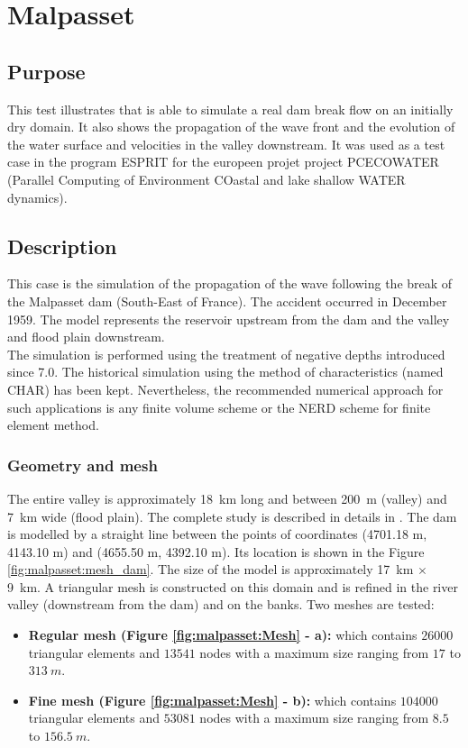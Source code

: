 \chapter{Malpasset}
\section{Purpose}
%
This test illustrates that  is able to simulate a real dam break flow
on an initially dry domain. It also shows the propagation of the wave front
and the evolution of the water surface and velocities in the valley downstream.
It was used as a test case in the program ESPRIT for the europeen projet project
PCECOWATER (Parallel Computing of Environment COastal and lake shallow WATER dynamics).
%
\section{Description}
%
This case is the simulation of the propagation of the wave following the break of the Malpasset dam (South-East of France). The accident occurred in December 1959. The model represents the reservoir upstream from the dam and the valley and flood plain downstream. \\

The simulation is performed using the treatment of negative depths introduced since  7.0. The historical simulation using the method of characteristics (named CHAR) has been kept. Nevertheless, the recommended numerical approach for such applications is any finite volume scheme or the NERD scheme for finite element method.

\subsection{Geometry and mesh}
The entire valley is approximately 18~km long and between 200~m (valley) and 7~km wide (flood plain). The complete study is described in details in \cite{Hervouet2007}.
The dam is modelled by a straight line between the points of coordinates (4701.18 m, 4143.10 m) and (4655.50 m, 4392.10 m). Its location is shown in the Figure \ref{fig:malpasset:mesh_dam}.
The size of the model is approximately  17~km $\times$ 9~km. A triangular mesh is constructed on this domain and is refined in the river valley (downstream from the dam) and on the banks.
Two meshes are tested:
\begin{itemize}
\item \textbf{Regular mesh (Figure \ref{fig:malpasset:Mesh} - a):}
which contains $26000$ triangular elements and $13541$ nodes with a maximum size ranging from $17$ to $313~m$.\\
\item \textbf{Fine mesh (Figure \ref{fig:malpasset:Mesh} - b):}
which contains $104000$ triangular elements and $53081$ nodes with a maximum size ranging from $8.5$ to $156.5~m$.
\end{itemize}

